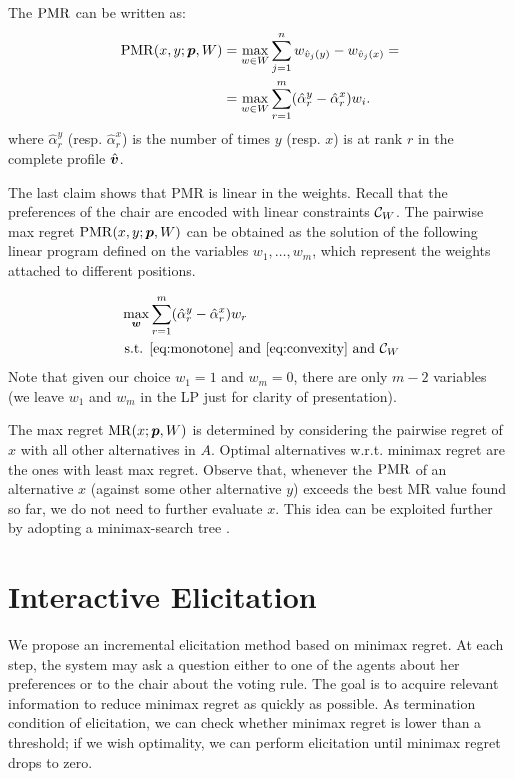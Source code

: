 \documentclass[sigconf, anonymous]{aamas}
\begin{document}
\begin{claim}
	The $\operatorname{PMR}$ can be written as:
	\begin{align} 
		\operatorname{PMR}(x,y; {\bm{p}}, W)  
		& = \max_{w \in W} \sum_{j=1}^n w_{\hat{v}_j(y)} - w_{\hat{v}_j(x)} = \\ 
		& = \max_{w \in W} \sum_{r=1}^m (\hat{\alpha}_{r}^{y} - \hat{\alpha}_{r}^{x}) w_i. 
	\end{align}
	where $\hat{\alpha}_{r}^{y}$ (resp. $\hat{\alpha}_{r}^{x}$)  is the number of times $y$ (resp. $x$) is at rank $r$ in the complete profile $\hat{\bm{v}}$.
\end{claim}
The last claim shows that PMR is linear in the weights.
Recall that the preferences of the chair are encoded with linear constraints $\mathcal{C}_{W}$.
The pairwise max regret $\operatorname{PMR}(x,y; {\bm{p}},W)$ can be obtained as the solution of the following linear program defined on the variables $w_1, …, w_m$, which represent the weights attached to different positions. 

\begin{align}
	\max_{\w} & \sum_{r=1}^m (\hat{\alpha}_{r}^{y} - \hat{\alpha}_{r}^{x}) w_{r}\\
	\text{ s.t. } & \text{\cref{eq:monotone}} \text{ and } \text{\cref{eq:convexity}} \text{ and } \Co_W
\end{align}
Note that given our choice $w_{1}=1$ and $w_{m}=0$, there are only $m-2$ variables 
(we leave $w_{1}$ and $w_{m}$ in the LP just for clarity of presentation).

The max regret $\operatorname{MR}(x; {\bm{p}}, W)$ is determined by considering the pairwise regret of $x$ with all other alternatives in $A$.
Optimal alternatives w.r.t. minimax regret are the ones with least max regret. 
Observe that, whenever the $\operatorname{PMR}$ of an alternative $x$ (against some other alternative $y$) exceeds the best MR value found so far, we do not need to further evaluate $x$. 
This idea can be exploited further by adopting a minimax-search tree \citep{Braziunas2011}.

\section{Interactive Elicitation} 
\label{sec:elicit}
We propose an incremental elicitation method based on minimax regret.
At each step, the system may ask a question either to one of the agents about her preferences or to the chair about the voting rule. 
The goal is to acquire relevant information to reduce minimax regret as quickly as possible.
As termination condition of elicitation, we can check whether minimax regret is lower than a threshold; if we wish optimality, we can perform elicitation until minimax regret drops to zero.
\end{document}
